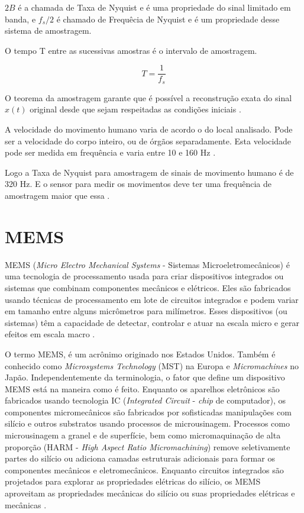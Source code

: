 $2B$ é a chamada de Taxa de Nyquist e é uma propriedade do sinal limitado em banda, e $f_{s}/2$ é chamado de Frequêcia de Nyquist e é um propriedade desse sistema de amostragem.

O tempo T entre as sucessivas amostras é o intervalo de amostragem.

\begin{equation}
T=\frac{1}{f_{s}}
\end{equation}

O teorema da amostragem garante que é possível a reconstrução exata do sinal $ x(t) $ original desde que sejam respeitadas as condições iniciais \cite{willsky2010}.

A velocidade do movimento humano varia de  acordo o do local analisado. Pode ser a velocidade do corpo inteiro, ou de órgãos separadamente. Esta velocidade pode ser medida em frequência e varia entre 10 e 160 Hz \cite{song2016}.

Logo a Taxa de Nyquist para amostragem de sinais de movimento humano é de 320 Hz. E o sensor para medir os movimentos deve ter uma frequência de amostragem maior que essa \cite{song2016}. 


	\section{MEMS}

		MEMS (\textit{Micro Electro Mechanical Systems} - Sistemas Microeletromecânicos) é uma tecnologia de processamento usada para criar dispositivos integrados ou sistemas que combinam componentes mecânicos e elétricos. Eles são fabricados usando técnicas de processamento em lote de circuitos integrados e podem variar em tamanho entre alguns micrômetros para milímetros. Esses dispositivos (ou sistemas) têm a capacidade de detectar, controlar e atuar na escala micro e gerar efeitos em escala macro \cite{prime2002}. 

		O termo MEMS, é um acrônimo originado nos Estados Unidos. Também é conhecido como \textit{Microsystems Technology} (MST) na Europa e \textit{Micromachines} no Japão. Independentemente da terminologia, o fator que define um dispositivo MEMS está na maneira como é feito. Enquanto os aparelhos eletrônicos são fabricados usando tecnologia IC (\textit{Integrated Circuit} - \textit{chip} de computador), os componentes micromecânicos são fabricados por sofisticadas manipulações com silício e outros substratos usando processos de microusinagem. Processos como microusinagem a granel e de superfície, bem como micromaquinação de alta proporção (HARM - \textit{High Aspect Ratio Micromachining}) remove seletivamente partes do silício ou adiciona camadas estruturais adicionais para formar os componentes mecânicos e eletromecânicos. Enquanto circuitos integrados são projetados para explorar as propriedades elétricas do silício, os MEMS aproveitam as propriedades mecânicas do silício ou suas propriedades elétricas e mecânicas \cite{prime2002}.


